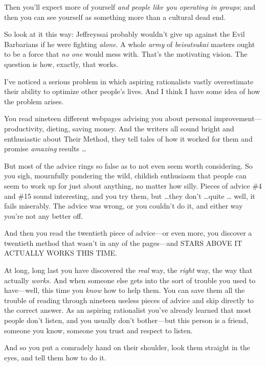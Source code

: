 {
 Then you'll expect more of yourself \textit{and
people like you operating in groups}; and then you can see yourself as
something more than a cultural dead end.}

{
 So look at it this way: Jeffreyssai probably
wouldn't give up against the Evil Barbarians if he were
fighting \textit{alone}. A whole \textit{army} of \textit{beisutsukai}
masters ought to be a force that \textit{no one} would mess with.
That's the motivating vision. The question is how,
exactly, that works.}

\myendsectiontext


{
 I've noticed a serious problem in which aspiring
rationalists vastly overestimate their ability to optimize other
people's lives. And I think I have some idea of how the
problem arises. }

{
 You read nineteen different webpages advising you about personal
improvement---productivity, dieting, saving money. And the writers all
sound bright and enthusiastic about Their Method, they tell tales of
how it worked for them and promise \textit{amazing} results \ldots}

{
 But most of the advice rings so false as to not even seem worth
considering. So you sigh, mournfully pondering the wild, childish
enthusiasm that people can seem to work up for just about anything, no
matter how silly. Pieces of advice \#4 and \#15 sound interesting, and
you try them, but \ldots they don't \ldots quite \ldots
well, it fails miserably. The advice was wrong, or you
couldn't do it, and either way you're
not any better off.}

{
 And then you read the twentieth piece of advice---or even more,
you discover a twentieth method that wasn't in any of
the pages---and STARS ABOVE IT ACTUALLY WORKS THIS TIME.}

{
 At long, long last you have discovered the \textit{real} way, the
\textit{right} way, the way that actually \textit{works.} And when
someone else gets into the sort of trouble you used to have---well,
this time you \textit{know} how to help them. You can save them all the
trouble of reading through nineteen useless pieces of advice and skip
directly to the correct answer. As an aspiring rationalist
you've already learned that most people
don't listen, and you usually don't
bother---but this person is a friend, someone you know, someone you
trust and respect to listen.}

{
 And so you put a comradely hand on their shoulder, look them
straight in the eyes, and tell them how to do it.}


